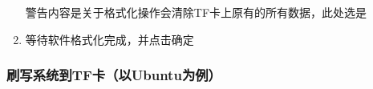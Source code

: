 \begin{enumerate}
  警告内容是关于格式化操作会清除TF卡上原有的所有数据，此处选是
\item
  等待软件格式化完成，并点击确定
\end{enumerate}

\subsubsection{刷写系统到TF卡（以Ubuntu为例）}\label{ux5237ux5199ux7cfbux7edfux5230tfux5361ux4ee5ubuntuux4e3aux4f8b}

